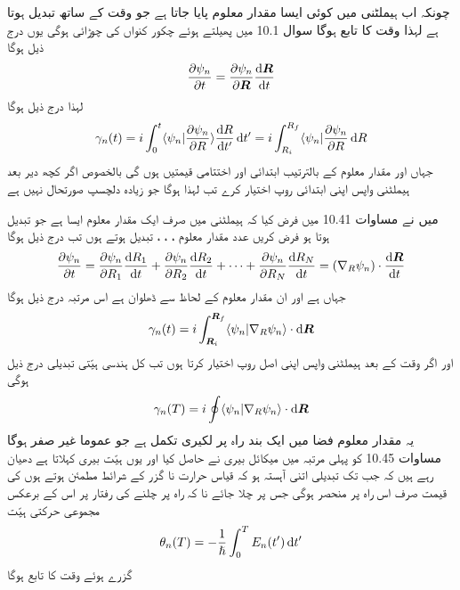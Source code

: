  چونکہ اب ہيملٹنی میں کوئی ایسا مقدار معلوم  پایا جاتا ہے جو وقت کے ساتھ تبدیل ہوتا ہے لہذا  وقت  کا تابع ہوگا سوال 10.1 میں پھیلتے ہوئے چکور کنواں کی چوڑائی  ہوگی یوں درج ذیل ہوگا 
\begin{align}
\frac{\partial \psi_n}{\partial t} = \frac{\partial \psi_n}{\partial \kvec{R}} \frac{\dif \kvec{R}}{\dif t}
\end{align}
لہذا درج ذیل ہوگا 
\begin{align}
\gamma_n (t) = i \int_0^t \langle \psi_n | \frac{\partial \psi_n}{\partial R} \rangle \frac{\dif R}{\dif t'} \dif t' = i \int_{R_i}^{R_f} \langle \psi_n | \frac{\partial \psi_n}{\partial R} \dif R 
\end{align}
جہاں  اور  مقدار معلوم  کے بالترتیب ابتدائی اور اختتامی قیمتیں ہوں گی بالخصوص اگر کچھ دیر  بعد ہیملٹنی واپس اپنی ابتدائی روپ اختیار کرے تب  لہذا  ہوگا جو زیادہ دلچسپ  صورتحال نہیں ہے

 میں نے مساوات 10.41 میں فرض کیا کہ ہيملٹنی میں صرف ایک مقدار معلوم ایسا ہے جو تبدیل ہوتا ہو فرض کریں  عدد مقدار معلوم ،  ، ،  تبدیل ہوتے ہوں تب درج ذیل ہوگا 
\begin{align}
\frac{\partial \psi_n}{\partial t} = \frac{\partial \psi_n}{\partial R_1} \frac{\dif R_1}{\dif t} + \frac{\partial \psi_n}{\partial R_2} \frac{\dif R_2}{\dif t} + \cdots + \frac{\partial \psi_n}{\partial R_N} \frac{\dif R_N}{\dif t} = (\nabla_R \psi_n) \cdot \frac{\dif \kvec{R}}{\dif t}
\end{align} 
جہاں  ہے اور  ان مقدار معلوم کے لحاظ سے ڈھلوان ہے اس مرتبہ درج ذیل ہوگا 
\begin{align}
\gamma_n (t) = i \int_{\kvec{R}_i}^{\kvec{R}_f} \langle \psi_n | \nabla_R \psi_n \rangle \cdot \dif \kvec{R}
\end{align}
اور اگر وقت  کے بعد ہیملٹنی واپس اپنی اصل روپ اختیار کرتا ہوں تب کل ہندسى ہیّتی تبدیلی درج ذیل ہوگی 
\begin{align}
\gamma_n (T) = i \oint \langle \psi_n | \nabla_R \psi_n \rangle \cdot \dif \kvec{R}
\end{align}
یہ مقدار معلوم فضا میں ایک بند راہ پر لکیری تکمل ہے جو عموما غیر صفر ہوگا مساوات 10.45 کو پہلی مرتبہ    میں میکائل بیری نے حاصل کیا اور یوں  ہیّت بیری کہلاتا ہے دھیان رہے ہیں کہ جب تک تبدیلی اتنی آہستہ ہو کہ قیاس حرارت نا گزر کے شرائط مطمئن ہوتے ہوں  کی قیمت صرف اس راہ پر منحصر ہوگی جس پر چلا جائے نا کہ راہ پر چلنے کی رفتار پر اس کے برعکس مجموعی حرکتی ہیّت 
\begin{align*}
\theta_n (T) = - \frac{1}{\hslash} \int_0^T E_n (t') \dif t'
\end{align*}
گزرے ہوئے وقت کا تابع ہوگا

